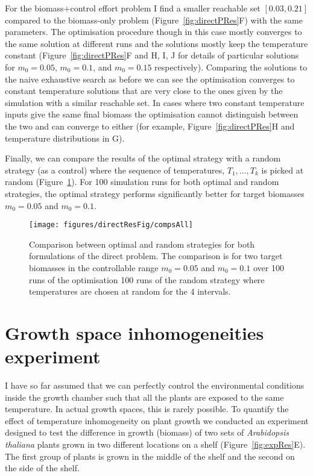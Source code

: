 For the biomass+control effort problem I find a smaller reachable set
$[0.03, 0.21]$ compared to the biomass-only problem
(Figure~\ref{fig:directPRes}F) with the same parameters. The optimisation
procedure though in this case mostly converges to the same solution at different
runs and the solutions mostly keep the temperature constant
(Figure~\ref{fig:directPRes}F and H, I, J for details of particular solutions
for $m_0=0.05$, $m_0=0.1$, and $m_0=0.15$ respectively). Comparing the solutions
to the naive exhaustive search as before we can see the optimisation converges
to constant temperature solutions that are very close to the ones given by the
simulation with a similar reachable set. In cases where two constant temperature
inputs give the same final biomass the optimisation cannot distinguish between
the two and can converge to either (for example, Figure~\ref{fig:directPRes}H
and temperature distributions in G).

Finally, we can compare the results of the optimal strategy with a random
strategy (as a control) where the sequence of temperatures, $T_1, \dots, T_k$ is
picked at random (Figure~\ref{fig:compsAllDir}). For 100 simulation runs for
both optimal and random strategies, the optimal strategy performs significantly
better for target biomasses $m_0=0.05$ and $m_0=0.1$.

\begin{figure}[tb]
\centering
\texttt{[image: figures/directResFig/compsAll]}
\caption{
  Comparison between optimal and random strategies for both formulations of the
  direct problem. The comparison is for two target biomasses in the controllable
  range $m_0=0.05$ and $m_0=0.1$ over 100 runs of the optimisation 100 runs of
  the random strategy where temperatures are chosen at random for the 4
  intervals.
}
\label{fig:compsAllDir}
\end{figure}


\section{Growth space inhomogeneities experiment}
\label{sec:exp}
I have so far assumed that we can perfectly control the environmental
conditions inside the growth chamber such that all the plants are exposed to the
same temperature. In actual growth spaces, this is rarely possible. To quantify
the effect of temperature inhomogeneity on plant growth we conducted an
experiment designed to test the difference in growth (biomass) of two sets of
\textit{Arabidopsis thaliana} plants grown in two different locations on a shelf
(Figure~\ref{fig:expRes}E). The first group of plants is grown in the middle of
the shelf and the second on the side of the shelf.

